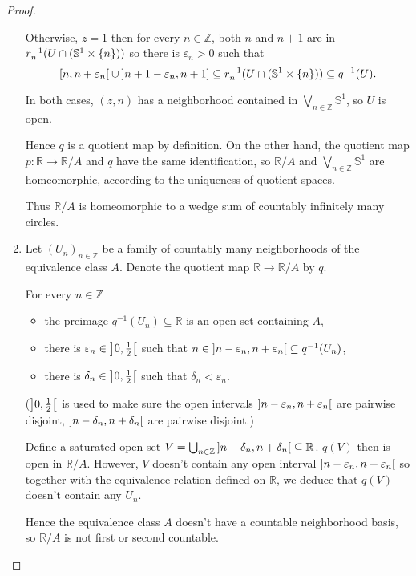\begin{proof}
\begin{enumerate}[label={(\alph*)}]
              Otherwise, $z = 1$ then for every $n\in\mathbb{Z}$, both $n$ and $n+1$ are in $r_{n}^{-1}(U \cap (\mathbb{S}^{1}\times\left\{{n}\right\}))$ so there is $\varepsilon_{n} > 0$ such that
              \begin{equation*}
                  \left[{n, n + \varepsilon_{n}}\right[ \cup \left]{n+1 - \varepsilon_{n}, n+1}\right] \subseteq r_{n}^{-1}(U \cap (\mathbb{S}^{1}\times\left\{{n}\right\})) \subseteq q^{-1}(U).
              \end{equation*}

              In both cases, $(z, n)$ has a neighborhood contained in $\bigvee_{n\in\mathbb{Z}}\mathbb{S}^{1}$, so $U$ is open.

              Hence $q$ is a quotient map by definition. On the other hand, the quotient map $p: \mathbb{R} \to \mathbb{R}/A$ and $q$ have the same identification, so $\mathbb{R}/A$ and $\bigvee_{n\in \mathbb{Z}}\mathbb{S}^{1}$ are homeomorphic, according to the uniqueness of quotient spaces.

              Thus $\mathbb{R}/A$ is homeomorphic to a wedge sum of countably infinitely many circles.
        \item Let ${(U_{n})}_{n\in\mathbb{Z}}$ be a family of countably many neighborhoods of the equivalence class $A$. Denote the quotient map $\mathbb{R}\to \mathbb{R}/A$ by $q$.

              For every $n\in\mathbb{Z}$
              \begin{itemize}
                  \item the preimage $q^{-1}(U_{n}) \subseteq \mathbb{R}$ is an open set containing $A$,
                  \item there is $\varepsilon_{n} \in \left]{0, \frac{1}{2}}\right[$ such that $n \in \left]{n - \varepsilon_{n}, n + \varepsilon_{n}}\right[ \subseteq q^{-1}(U_{n})$,
                  \item there is $\delta_{n} \in \left]{0, \frac{1}{2}}\right[$ such that $\delta_{n} < \varepsilon_{n}$.
              \end{itemize}

              ($\left]{0, \frac{1}{2}}\right[$ is used to make sure the open intervals $\left]{n - \varepsilon_{n}, n + \varepsilon_{n}}\right[$ are pairwise disjoint, $\left]{n - \delta_{n}, n + \delta_{n}}\right[$ are pairwise disjoint.)

              Define a saturated open set $V = \bigcup_{n\in\mathbb{Z}} \left]{n - \delta_{n}, n + \delta_{n}}\right[ \subseteq \mathbb{R}$. $q(V)$ then is open in $\mathbb{R}/A$. However, $V$ doesn't contain any open interval $\left]{n - \varepsilon_{n}, n + \varepsilon_{n}}\right[$ so together with the equivalence relation defined on $\mathbb{R}$, we deduce that $q(V)$ doesn't contain any $U_{n}$.

              Hence the equivalence class $A$ doesn't have a countable neighborhood basis, so $\mathbb{R}/A$ is not first or second countable.
    \end{enumerate}
\end{proof}

